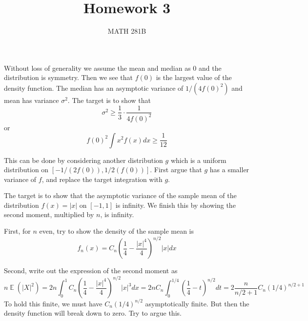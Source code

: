 \documentclass[12pt]{article}
\newcommand{\1}{\mathbbm{1}}
\newenvironment{exercise}[2][Exercise]{\begin{trivlist}
\item[\hskip \labelsep {\bfseries #1}\hskip \labelsep {\bfseries #2.}]}{\end{trivlist}}
\newcommand{\E}{\operatorname{\mathbb{E}}}
\begin{document}
\title{Homework 3}%
\author{MATH 281B} %
\maketitle
\begin{exercise}{Show ARE of sample mean and median for unimodal model $\geq 1/3$}
\end{exercise}

Without loss of generality we assume the mean and median as $0$ and the distribution is symmetry. Then we see that $f(0)$ is the largest value of the density function. The median has an asymptotic variance of $1/(4f(0)^2)$ and mean has variance $\sigma^2$. The target is to show that
$$
 \sigma^2 \geq \frac{1}{3} \cdot \frac{1}{4f(0)^2}
$$
or
$$
f(0)^2 \int x^2 f(x)dx \geq \frac{1}{12}
$$

This can be done by considering another distribution $g$ which is a uniform distribution on $[-1/(2f(0)) , 1/2(f(0))]$. First argue that $g$ has a smaller variance of $f$, and replace the target integration with $g$.

\begin{exercise}{Unstability of median}
\end{exercise}

The target is to show that the asymptotic variance of the sample mean of the distribution $f (x) = |x| $ on $[-1,1]$ is infinity. We finish this by showing the second moment, multiplied by $n$, is infinity.

First, for $n$ even, try to show the density of the sample mean is
$$
f_n(x) = C_n (\frac{1}{4} - \frac{|x|^4}{4})^{n/2} |x| dx
$$

Second, write out the expression of the second moment as
$$
n\E (|X|^2) = 2n \int_0^1  C_n (\frac{1}{4} - \frac{|x|^4}{4})^{n/2} |x|^3 dx = 2nC_n \int_0^{1/4} (\frac{1}{4} -t)^{n/2} dt = 2\frac{n}{n/2+1}C_n (1/4)^{n/2+1}
$$
To hold this finite, we must have $C_n (1/4)^{n/2}$ asymptotically finite. But then the density function will break down to zero. Try to argue this.
\end{document}
